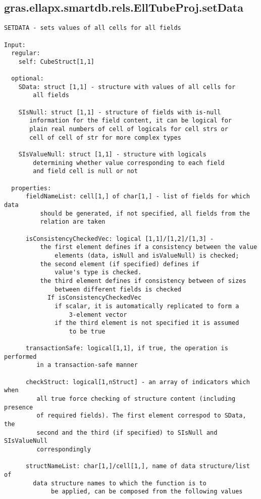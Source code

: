 \subsection{\texorpdfstring{gras.ellapx.smartdb.rels.EllTubeProj.setData}{setData}}\label{method:gras.ellapx.smartdb.rels.EllTubeProj.setData}
\begin{verbatim}
SETDATA - sets values of all cells for all fields

Input:
  regular:
    self: CubeStruct[1,1]

  optional:
    SData: struct [1,1] - structure with values of all cells for
        all fields

    SIsNull: struct [1,1] - structure of fields with is-null
       information for the field content, it can be logical for
       plain real numbers of cell of logicals for cell strs or
       cell of cell of str for more complex types

    SIsValueNull: struct [1,1] - structure with logicals
        determining whether value corresponding to each field
        and field cell is null or not

  properties:
      fieldNameList: cell[1,] of char[1,] - list of fields for which data
          should be generated, if not specified, all fields from the
          relation are taken

      isConsistencyCheckedVec: logical [1,1]/[1,2]/[1,3] -
          the first element defines if a consistency between the value
              elements (data, isNull and isValueNull) is checked;
          the second element (if specified) defines if
              value's type is checked.
          the third element defines if consistency between of sizes
              between different fields is checked
            If isConsistencyCheckedVec
              if scalar, it is automatically replicated to form a
                  3-element vector
              if the third element is not specified it is assumed
                  to be true

      transactionSafe: logical[1,1], if true, the operation is performed
         in a transaction-safe manner

      checkStruct: logical[1,nStruct] - an array of indicators which when
         all true force checking of structure content (including presence
         of required fields). The first element correspod to SData, the
         second and the third (if specified) to SIsNull and SIsValueNull
         correspondingly

      structNameList: char[1,]/cell[1,], name of data structure/list of
        data structure names to which the function is to
             be applied, can be composed from the following values


\end{verbatim}
